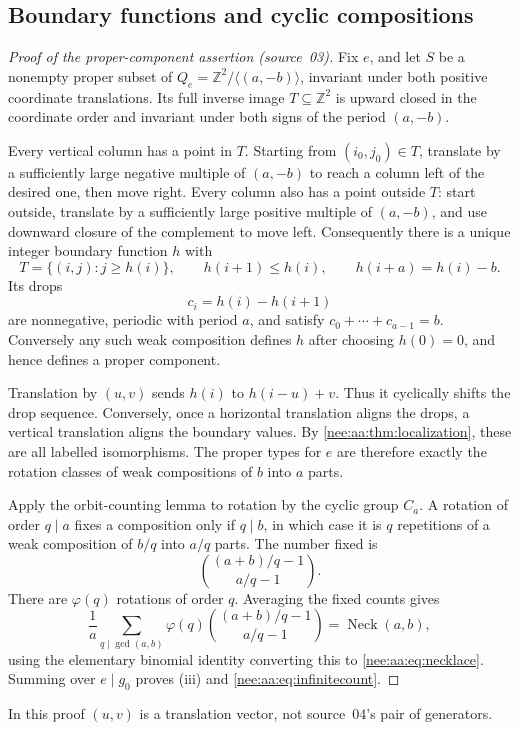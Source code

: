 \documentclass[11pt,letterpaper]{article}
\numberwithin{equation}{section}
\theoremstyle{plain}
\theoremstyle{definition}
\theoremstyle{remark}
\newcommand{\ZZ}{\mathbb Z}
\newcommand{\Neck}{\operatorname{Neck}}
\begin{document}
\subsection{Boundary functions and cyclic compositions}

\begin{proof}[Proof of the proper-component assertion (source~03)]
Fix $e$, and let $S$ be a nonempty proper subset of
$Q_e=\ZZ^2/\langle(a,-b)\rangle$, invariant under both positive coordinate
translations. Its full inverse image $T\subseteq\ZZ^2$ is upward closed in
the coordinate order and invariant under both signs of the period $(a,-b)$.

Every vertical column has a point in $T$. Starting from $(i_0,j_0)\in T$,
translate by a sufficiently large negative multiple of $(a,-b)$ to reach a
column left of the desired one, then move right. Every column also has a
point outside $T$: start outside, translate by a sufficiently large positive
multiple of $(a,-b)$, and use downward closure of the complement to move left.
Consequently there is a unique integer boundary function $h$ with
\[
T=\{(i,j):j\geq h(i)\},\qquad
h(i+1)\leq h(i),\qquad h(i+a)=h(i)-b.
\]
Its drops
\[
c_i=h(i)-h(i+1)
\]
are nonnegative, periodic with period $a$, and satisfy
$c_0+\cdots+c_{a-1}=b$. Conversely any such weak composition defines $h$
after choosing $h(0)=0$, and hence defines a proper component.

Translation by $(u,v)$ sends $h(i)$ to $h(i-u)+v$. Thus it cyclically shifts
the drop sequence. Conversely, once a horizontal translation aligns the
drops, a vertical translation aligns the boundary values. By
\cref{nee:aa:thm:localization}, these are all labelled isomorphisms. The proper
types for $e$ are therefore exactly the rotation classes of weak
compositions of $b$ into $a$ parts.

Apply the orbit-counting lemma to rotation by the cyclic group $C_a$.
A rotation of order $q\mid a$ fixes a composition only if $q\mid b$, in
which case it is $q$ repetitions of a weak composition of $b/q$ into
$a/q$ parts. The number fixed is
\[
\binom{(a+b)/q-1}{a/q-1}.
\]
There are $\varphi(q)$ rotations of order $q$. Averaging the fixed counts
gives
\[
\frac1a\sum_{q\mid\gcd(a,b)}\varphi(q)
\binom{(a+b)/q-1}{a/q-1}=\Neck(a,b),
\]
using the elementary binomial identity converting this to
\eqref{nee:aa:eq:necklace}. Summing over $e\mid g_0$ proves (iii) and
\eqref{nee:aa:eq:infinitecount}.
\end{proof}

In this proof $(u,v)$ is a translation vector, not source~04's pair of generators.
\end{document}

